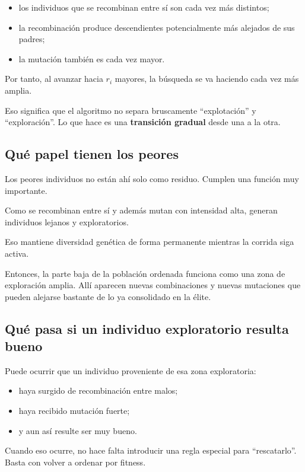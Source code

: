 \documentclass[11pt]{article}
\begin{document}
\begin{itemize}
  \item los individuos que se recombinan entre s\'i son cada vez m\'as
  distintos;
  \item la recombinaci\'on produce descendientes potencialmente m\'as alejados
  de sus padres;
  \item la mutaci\'on tambi\'en es cada vez mayor.
\end{itemize}

Por tanto, al avanzar hacia \(r_i\) mayores, la b\'usqueda se va haciendo cada
vez m\'as amplia.

Eso significa que el algoritmo no separa bruscamente ``explotaci\'on'' y
``exploraci\'on''. Lo que hace es una \textbf{transici\'on gradual} desde una a
la otra.

\subsection{Qu\'e papel tienen los peores}

Los peores individuos no est\'an ah\'i solo como residuo. Cumplen una funci\'on
muy importante.

Como se recombinan entre s\'i y adem\'as mutan con intensidad alta, generan
individuos lejanos y exploratorios.

Eso mantiene diversidad gen\'etica de forma permanente mientras la corrida siga
activa.

Entonces, la parte baja de la poblaci\'on ordenada funciona como una zona de
exploraci\'on amplia. All\'i aparecen nuevas combinaciones y nuevas mutaciones
que pueden alejarse bastante de lo ya consolidado en la \'elite.

\subsection{Qu\'e pasa si un individuo exploratorio resulta bueno}

Puede ocurrir que un individuo proveniente de esa zona exploratoria:

\begin{itemize}
  \item haya surgido de recombinaci\'on entre malos;
  \item haya recibido mutaci\'on fuerte;
  \item y aun as\'i resulte ser muy bueno.
\end{itemize}

Cuando eso ocurre, no hace falta introducir una regla especial para
``rescatarlo''. Basta con volver a ordenar por fitness.
\end{document}
